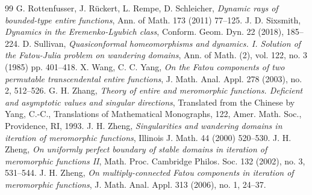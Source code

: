\documentclass[11pt,a4paper]{article}
\begin{document}
\begin{thebibliography}{99}
	G. Rottenfusser, J. R\"{u}ckert, L. Rempe, D. Schleicher, \emph{Dynamic rays of bounded-type entire
		functions}, Ann. of Math. 173 (2011) 77–125.
	 J. D. Sixsmith,  \emph{Dynamics in the Eremenko-Lyubich class}, Conform. Geom. Dyn. 22 (2018), 185–224.
	D. Sullivan, \emph{Quasiconformal homeomorphisms and dynamics. I. Solution of the Fatou-Julia problem on wandering domains}, Ann. of Math. (2), vol. 122, no. 3 (1985) pp. 401–418.
	X. Wang, C. C. Yang, \emph{On the Fatou components of two permutable transcendental entire functions}, J. Math. Anal. Appl. 278 (2003), no. 2, 512–526.
	G. H. Zhang,  \emph{Theory of entire and meromorphic functions. Deficient and asymptotic values and singular directions}, Translated from the Chinese by Yang, C.-C., Translations of Mathematical Monographs, 122, Amer. Math. Soc., Providence, RI, 1993.
	J. H. Zheng, \emph{Singularities and wandering domains in iteration of meromorphic functions}, Illinois
	J. Math. 44 (2000) 520–530.
	J. H. Zheng, \emph{On uniformly perfect boundary of stable domains in iteration of meromorphic functions II},
	Math. Proc. Cambridge Philos. Soc. 132 (2002), no. 3, 531–544.
	J. H. Zheng, \emph{On multiply-connected Fatou components in iteration of meromorphic functions},
	J. Math. Anal. Appl. 313 (2006), no. 1, 24–37.
\end{thebibliography}
\end{document}
